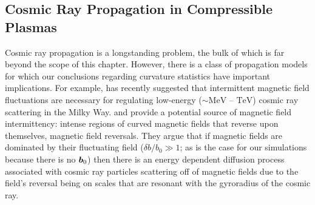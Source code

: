\subsection{Cosmic Ray Propagation in Compressible Plasmas}

Cosmic ray propagation is a longstanding problem, the bulk of which is far beyond the scope of this chapter. However, there is a class of propagation models for which our conclusions regarding curvature statistics have important implications. For example, \citet{butsky2023galactic} has recently suggested that intermittent magnetic field fluctuations are necessary for regulating low-energy ($\sim \mathrm{MeV}$ -- $\mathrm{TeV}$) cosmic ray scattering in the Milky Way. \citet{kempski2023cosmic} and \citet{Lemoine2023_field_reversal_CR_transport} provide a potential source of magnetic field intermittency: intense regions of curved magnetic fields that reverse upon themselves, \ie magnetic field reversals. They argue that if magnetic fields are dominated by their fluctuating field ($\delta b/b_0 \gg 1$; as is the case for our simulations because there is no $\bm{b}_0$) then there is an energy dependent diffusion process associated with cosmic ray particles scattering off of magnetic fields due to the field's reversal being on scales that are resonant with the gyroradius of the cosmic ray.

